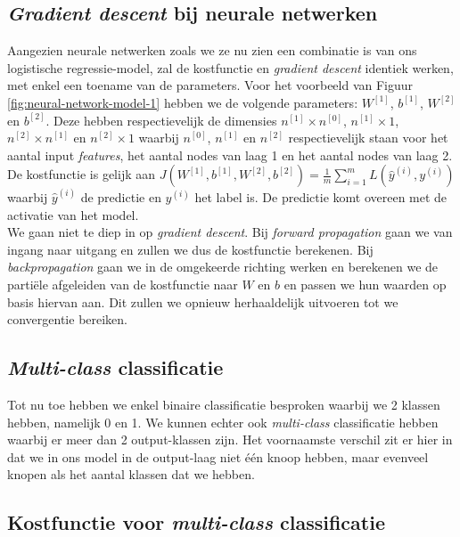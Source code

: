 \subsection{\textit{Gradient descent} bij neurale netwerken}

Aangezien neurale netwerken zoals we ze nu zien een combinatie is van ons logistische regressie-model, zal de kostfunctie en \textit{gradient descent} identiek werken, met enkel een toename van de parameters. Voor het voorbeeld van Figuur \ref{fig:neural-network-model-1} hebben we de volgende parameters: $W^{[1]}$, $b^{[1]}$, $W^{[2]}$ en $b^{[2]}$. Deze hebben respectievelijk de dimensies $n^{[1]}\times n^{[0]}$, $n^{[1]}\times 1$, $n^{[2]}\times n^{[1]}$ en $n^{[2]}\times 1$ waarbij $n^{[0]}$, $n^{[1]}$ en $n^{[2]}$ respectievelijk staan voor het aantal input \textit{features}, het aantal nodes van laag 1 en het aantal nodes van laag 2. De kostfunctie is gelijk aan $J(W^{[1]}, b^{[1]}, W^{[2]}, b^{[2]}) = \frac{1}{m} \sum_{i=1}^{m} L(\hat{y}^{(i)}, y^{(i)})$ waarbij $\hat{y}^{(i)}$ de predictie en $y^{(i)}$ het label is. De predictie komt overeen met de activatie van het model. \\
\newline
We gaan niet te diep in op \textit{gradient descent}. Bij \textit{forward propagation} gaan we van ingang naar uitgang en zullen we dus de kostfunctie berekenen. Bij \textit{backpropagation} gaan we in de omgekeerde richting werken en berekenen we de partiële afgeleiden van de kostfunctie naar $W$ en $b$ en passen we hun waarden op basis hiervan aan. Dit zullen we opnieuw herhaaldelijk uitvoeren tot we convergentie bereiken. 

\subsection{\textit{Multi-class} classificatie}

Tot nu toe hebben we enkel binaire classificatie besproken waarbij we 2 klassen hebben, namelijk 0 en 1. We kunnen echter ook \textit{multi-class} classificatie hebben waarbij er meer dan 2 output-klassen zijn. Het voornaamste verschil zit er hier in dat we in ons model in de output-laag niet één knoop hebben, maar evenveel knopen als het aantal klassen dat we hebben.

\subsection{Kostfunctie voor \textit{multi-class} classificatie}

